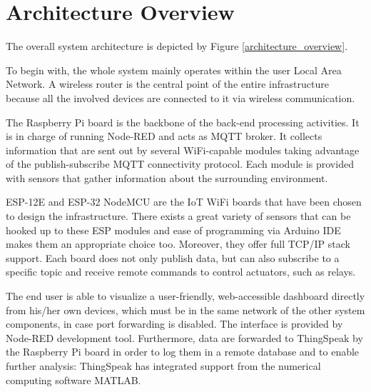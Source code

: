 \section{Architecture Overview}
The overall system architecture is depicted by Figure \ref{architecture_overview}.

To begin with, the whole system mainly operates within the user Local Area Network. A wireless router is the central point of the entire infrastructure because all the involved devices are connected to it via wireless communication.

The Raspberry Pi board is the backbone of the back-end processing activities. It is in charge of running Node-RED and acts as MQTT broker. It collects information that are sent out by several WiFi-capable modules taking advantage of the publish-subscribe MQTT connectivity protocol. Each module is provided with sensors that gather information about the surrounding environment.

ESP-12E and ESP-32 NodeMCU are the IoT WiFi boards that have been chosen to design the infrastructure. There exists a great variety of sensors that can be hooked up to these ESP modules and ease of programming via Arduino IDE makes them an appropriate choice too. Moreover, they offer full TCP/IP stack support.
Each board does not only publish data, but can also subscribe to a specific topic and receive remote commands to control actuators, such as relays.

The end user is able to visualize a user-friendly, web-accessible dashboard directly from his/her own devices, which must be in the same network of the other system components, in case port forwarding is disabled. The interface is provided by Node-RED development tool.
Furthermore, data are forwarded to ThingSpeak by the Raspberry Pi board in order to log them in a remote database and to enable further analysis: ThingSpeak has integrated support from the numerical computing software MATLAB.

